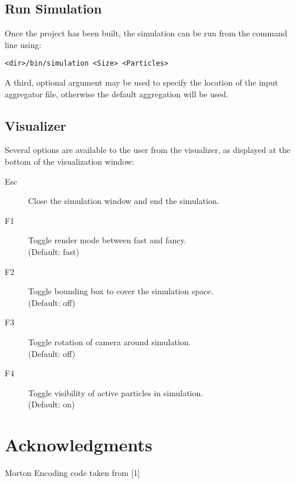 \documentclass[fleqn,10pt]{SelfArx} %
\begin{document}
\subsection{Run Simulation}
Once the project has been built, the simulation can be run from the command line using:
\begin{center}
    \texttt{<dir>/bin/simulation <Size> <Particles>}
\end{center}
A third, optional argument may be used to specify the location of the input aggregator file, otherwise the default aggregation will be used.
\subsection{Visualizer}
Several options are available to the user from the visualizer, as displayed at the bottom of the visualization window:
\begin{description}
    \item[Esc] Close the simulation window and end the simulation.
    \item[F1] Toggle render mode between fast and fancy.\\ (Default: fast)
    \item[F2] Toggle bounding box to cover the simulation space.\\ (Default: off)
    \item[F3] Toggle rotation of camera around simulation.\\ (Default: off)
    \item[F4] Toggle visibility of active particles in simulation.\\ (Default: on)
\end{description}



\section*{Acknowledgments} %
Morton Encoding code taken from [1]



\end{document}
